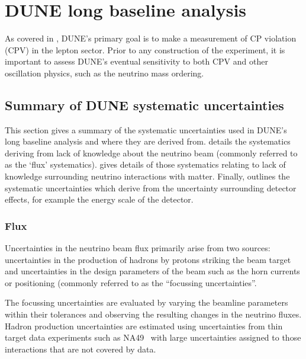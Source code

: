 \chapter{DUNE long baseline analysis}
\label{sec:dune_lbl}

As covered in , DUNE's primary goal is to make a measurement of CP violation (CPV) in the lepton sector.
Prior to any construction of the experiment, it is important to assess DUNE's eventual sensitivity to both CPV and other oscillation physics, such as the neutrino mass ordering.

\section{Summary of DUNE systematic uncertainties}
\label{sec:dune_lbl:systs}

This section gives a summary of the systematic uncertainties used in DUNE's long baseline analysis and where they are derived from.
 details the systematics deriving from lack of knowledge about the neutrino beam (commonly referred to as the `flux' systematics).
 gives details of those systematics relating to lack of knowledge surrounding neutrino interactions with matter.
Finally,  outlines the systematic uncertainties which derive from the uncertainty surrounding detector effects, for example the energy scale of the detector.

\subsection{Flux}
\label{sec:dune_lbl:systs:flux}

Uncertainties in the neutrino beam flux primarily arise from two sources: uncertainties in the production of hadrons by protons striking the beam target and uncertainties in the design parameters of the beam such as the horn currents or positioning (commonly referred to as the ``focussing uncertainties''.

The focussing uncertainties are evaluated by varying the beamline parameters within their tolerances and observing the resulting changes in the neutrino fluxes.
Hadron production uncertainties are estimated using uncertainties from thin target data experiments such as NA49~\cite{na49} with large uncertainties assigned to those interactions that are not covered by data.

